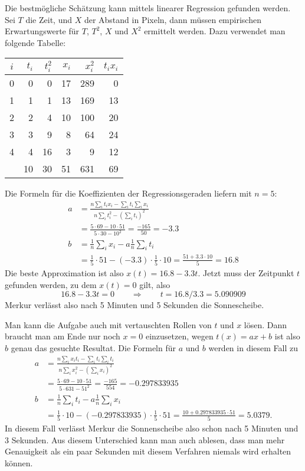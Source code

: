 \begin{loesung}
Die bestmögliche Schätzung kann mittels linearer Regression
gefunden werden. Sei $T$ die Zeit, und $X$ der Abstand in Pixeln,
dann müssen empirischen Erwartungswerte für $T$, $T^2$, $X$ und $X^2$
ermittelt werden. Dazu verwendet man folgende Tabelle:
\begin{center}
\begin{tabular}{|c|rr|rr|r|}
\hline
$i$&$t_i$&$t_i^2$&$x_i$&$x_i^2$&$t_ix_i$\\
\hline
0& 0& 0&17&289& 0\\
1& 1& 1&13&169&13\\
2& 2& 4&10&100&20\\
3& 3& 9& 8& 64&24\\
4& 4&16& 3&  9&12\\
\hline
 &10&30&51&631&69\\
\hline
\end{tabular}
\end{center}
Die Formeln für die Koeffizienten der Regressionsgeraden liefern
mit $n=5$:
\begin{align*}
a&=
\frac{n\sum_i t_ix_i -\sum_it_i\sum_ix_i}{n\sum_it_i^2-(\sum_i t_i)^2}
\\
&=\frac{5\cdot 69 - 10\cdot 51}{5\cdot 30 - 10^2}=\frac{-165}{50}=-3.3
\\
b&=\frac1n\sum_ix_i-a\frac1n\sum_it_i\\
&=\frac15\cdot 51-(-3.3)\cdot \frac15\cdot 10=\frac{51+3.3 \cdot 10}5= 16.8
\end{align*}
Die beste Approximation ist also $x(t)=16.8-3.3t$.
Jetzt muss der Zeitpunkt $t$ gefunden werden, zu dem $x(t)=0$ gilt,
also
\[
16.8-3.3t=0\qquad\Rightarrow\qquad t=16.8/3.3=5.090909
\]
Merkur verlässt also nach 5 Minuten und 5 Sekunden die Sonnescheibe.

Man kann die Aufgabe auch mit vertauschten Rollen von $t$ und $x$
lösen. Dann braucht man am Ende nur noch $x=0$ einzusetzen, wegen
$t(x)=ax+b$ ist also $b$ genau das gesuchte Resultat. Die Formeln
für $a$ und $b$ werden in diesem Fall zu
\begin{align*}
a&=
\frac{n\sum_i x_it_i -\sum_it_i\sum_it_i}{n\sum_ix_i^2-(\sum_i x_i)^2}
\\
&=\frac{5\cdot 69 - 10\cdot 51}{5\cdot 631 - 51^2}=\frac{-165}{554}=-0.297833935
\\
b&=\frac1n\sum_it_i-a\frac1n\sum_ix_i\\
&=\frac15\cdot 10-(-0.297833935)\cdot\frac15\cdot 51=\frac{10+ 0.297833935\cdot 51}5= 5.0379.
\end{align*}
In diesem Fall verlässt Merkur die Sonnenscheibe also schon nach 5 Minuten
und 3 Sekunden. Aus diesem Unterschied kann man auch ablesen, dass man
mehr Genauigkeit als ein paar Sekunden mit diesem Verfahren niemals
wird erhalten können.
\end{loesung}

